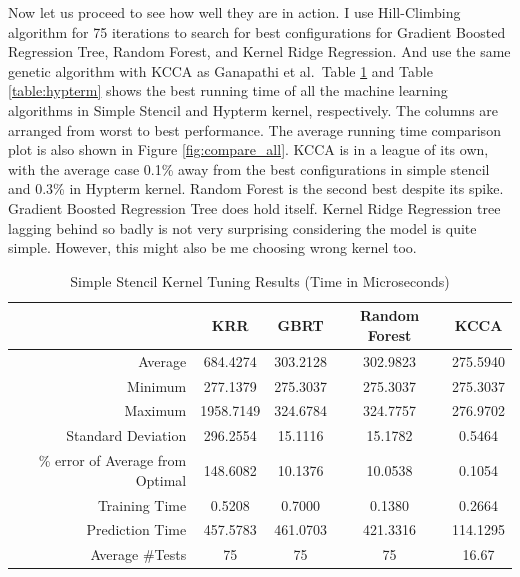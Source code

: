 Now let us proceed to see how well they are in action. I use Hill-Climbing algorithm for 75 iterations to search for best configurations for Gradient Boosted Regression Tree, Random Forest, and Kernel Ridge Regression. And use the same genetic algorithm with KCCA as Ganapathi et al.\ Table \ref{table:simple} and Table \ref{table:hypterm} shows the best running time of all the machine learning algorithms in Simple Stencil and Hypterm kernel, respectively. The columns are arranged from worst to best performance. The average running time comparison plot is also shown in Figure \ref{fig:compare_all}. KCCA is in a league of its own, with the average case 0.1\% away from the best configurations in simple stencil and 0.3\% in Hypterm kernel. Random Forest is the second best despite its spike. Gradient Boosted Regression Tree does hold itself. Kernel Ridge Regression tree lagging behind so badly is not very surprising considering the model is quite simple. However, this might also be me choosing wrong kernel too.

\begin{table}[ht]
\caption{Simple Stencil Kernel Tuning Results (Time in Microseconds)}
\center
\begin{tabular}{r c c c c}
\hline
 & KRR	& GBRT	& Random Forest	& KCCA \\
\hline\hline
Average	& 684.4274	& 303.2128	& 302.9823	& 275.5940 \\
Minimum	& 277.1379	& 275.3037	& 275.3037	& 275.3037 \\
Maximum	& 1958.7149	& 324.6784	& 324.7757	& 276.9702 \\
Standard Deviation	& 296.2554	& 15.1116	& 15.1782	& 0.5464 \\
\% error of Average from Optimal	& 148.6082	& 10.1376	& 10.0538	& 0.1054 \\
\cline{2-5}
Training Time & 0.5208 & 0.7000 & 0.1380 & 0.2664 \\
Prediction Time & 457.5783 & 461.0703 & 421.3316 & 114.1295 \\
Average \#Tests & 75 & 75 & 75 & 16.67 \\
\hline
\end{tabular}
\label{table:simple}
\end{table}

